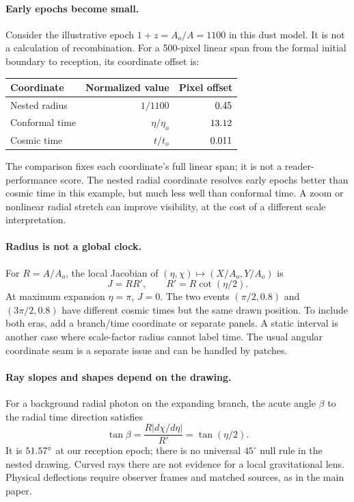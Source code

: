 \documentclass[11pt,a4paper]{article}
\begin{document}
\paragraph{Early epochs become small.}
Consider the illustrative epoch $1+z=A_o/A=1100$ in this dust model.
It is not a calculation of recombination. For a 500-pixel linear span from
the formal initial boundary to reception, its coordinate offset is:
\begin{center}
\begin{tabular}{lrr}
\toprule
Coordinate & Normalized value & Pixel offset\\
\midrule
Nested radius & $1/1100$ & $0.45$\\
Conformal time & $\eta/\eta_o$ & $13.12$\\
Cosmic time & $t/t_o$ & $0.011$\\
\bottomrule
\end{tabular}
\end{center}
The comparison fixes each coordinate's full linear span; it is not a
reader-performance score. The nested radial coordinate resolves early
epochs better than cosmic time in this example, but much less well than
conformal time. A zoom or nonlinear radial stretch can improve visibility,
at the cost of a different scale interpretation.

\paragraph{Radius is not a global clock.}
For $R=A/A_o$, the local Jacobian of $(\eta,\chi)\mapsto(X/A_o,Y/A_o)$ is
\[
 J=R R',\qquad R'=R\cot(\eta/2).
\]
At maximum expansion $\eta=\pi$, $J=0$. The two events
$(\pi/2,0.8)$ and $(3\pi/2,0.8)$ have different cosmic times but the same
drawn position. To include both eras, add a branch/time coordinate or
separate panels. A static interval is another case where scale-factor
radius cannot label time. The usual angular coordinate seam is a separate
issue and can be handled by patches.

\paragraph{Ray slopes and shapes depend on the drawing.}
For a background radial photon on the expanding branch, the acute angle
$\beta$ to the radial time direction satisfies
\[
 \tan\beta=\frac{R|d\chi/d\eta|}{R'}=\tan(\eta/2).
\]
It is $51.57^\circ$ at our reception epoch; there is no universal
$45^\circ$ null rule in the nested drawing. Curved rays there are not
evidence for a local gravitational lens. Physical deflections require
observer frames and matched sources, as in the main paper.
\end{document}
